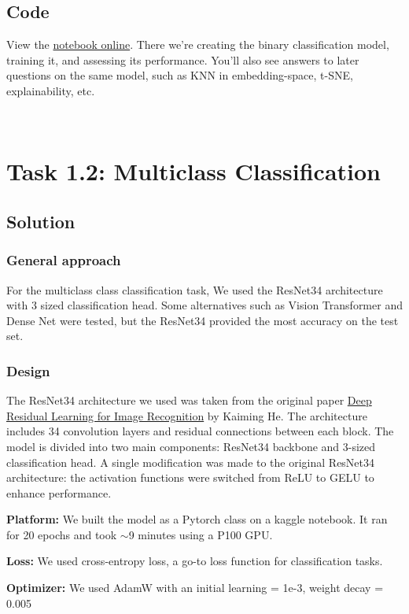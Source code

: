 \documentclass{article}
\begin{document}
\subsection{Code}

View the \href{https://www.kaggle.com/code/nitsanbh/lungs-x-ray}{notebook online}. There we're creating the binary classification model, training it, and assessing its performance. You'll also see answers to later questions on the same model, such as KNN in embedding-space, t-SNE, explainability, etc.

\
\section{Task 1.2: Multiclass Classification}

\subsection{Solution}
\subsubsection{General approach}
For the multiclass class classification task, We used the ResNet34 architecture with 3 sized classification head. Some alternatives such as Vision Transformer and Dense Net were tested, but the ResNet34 provided the most accuracy on the test set.

\subsubsection{Design}
The ResNet34 architecture we used was taken from the original paper \href{https://arxiv.org/pdf/1512.03385.pdf}{Deep Residual Learning for Image Recognition} by Kaiming He. The architecture includes 34 convolution layers and residual connections between each block. The model is divided into two main components: ResNet34 backbone and 3-sized classification head. A single modification was made to the original ResNet34 architecture: the activation functions were switched from ReLU to GELU to enhance performance.

\textbf{Platform:} We built the model as a Pytorch class on a kaggle notebook. It ran for 20 epochs and took $\sim$9 minutes using a P100 GPU. 

\textbf{Loss:} We used cross-entropy loss, a go-to loss function for classification tasks.

\textbf{Optimizer:} We used AdamW with an initial learning = 1e-3, weight decay = 0.005
\end{document}
